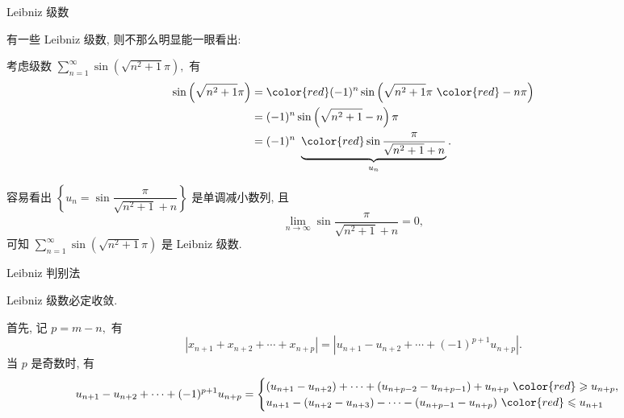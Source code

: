 
\begin{frame}{Leibniz 级数}

有一些 Leibniz 级数, 则不那么明显能一眼看出:

\pause
\vspace{0.5em}

考虑级数 $\sum\limits_{n=1}^\infty \sin \left( \sqrt{n^2+1} \pi \right),$ 有
\begin{align*}
\sin \left( \sqrt{n^2+1} \pi \right) & = {\color{red} (-1)^n} \sin \left( \sqrt{n^2+1} \pi ~ {\color{red} - n\pi} \right) \\
& = (-1)^n \sin \left( \sqrt{n^2+1} - n \right) \pi \\
& = (-1)^n ~ \underbrace{\color{red} \sin \dfrac{\pi}{\sqrt{n^2+1} + n}}_{u_n}.
\end{align*}

\pause

容易看出 $\left\{ u_n = \sin \dfrac{\pi}{\sqrt{n^2+1} + n} \right\}$ 是单调减小数列, 且
\[\lim\limits_{n\to\infty} \sin \dfrac{\pi}{\sqrt{n^2+1} + n} = 0,\]
可知 $\sum\limits_{n=1}^\infty \sin \left( \sqrt{n^2+1} \pi \right)$ 是 Leibniz 级数.

\end{frame}


\begin{frame}{Leibniz 判别法}

\begin{thm}
\begin{center}
Leibniz 级数必定收敛.
\end{center}
\end{thm}

\pause
\vspace{0.5em}

\startproof[bg=yellow, fg=red]
首先, 记 $p = m - n,$ 有
\[\left\lvert x_{n+1} + x_{n+2} + \cdots + x_{n+p} \right\rvert = \left\lvert u_{n+1} - u_{n+2} + \cdots + (-1)^{p+1} u_{n+p} \right\rvert.\]
\pause
当 $p$ 是奇数时, 有
\begin{equation*}
u_{n+1} - u_{n+2} + \cdots + (-1)^{p+1} u_{n+p}
= \begin{cases}
(u_{n+1} - u_{n+2}) + \cdots + (u_{n+p-2} - u_{n+p-1}) + u_{n+p} ~ {\color{red} \geqslant u_{n+p}}, \\
u_{n+1} - (u_{n+2} - u_{n+3}) - \cdots - (u_{n+p-1} - u_{n+p}) ~ {\color{red} \leqslant u_{n+1}}
\end{cases}
\end{equation*}

\end{frame}

